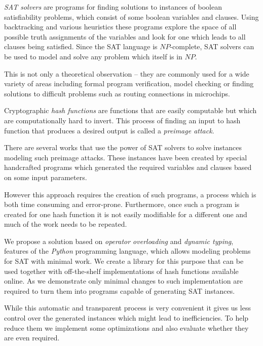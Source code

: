 
\emph{SAT solvers} are programs for finding solutions to instances of boolean satisfiability problems, which consist of some boolean variables and clauses.
Using backtracking and various heuristics these programs explore the space of all possible truth assignments of the variables and look for one which leads to all clauses being satisfied.
Since the SAT language is $NP$-complete, SAT solvers can be used to model and solve any problem which itself is in $NP$.

This is not only a theoretical observation -- they are commonly used for a wide variety of areas including formal program verification, model checking or finding solutions to difficult problems such as routing connections in microchips.

Cryptographic \emph{hash functions} are functions that are easily computable but which are computationally hard to invert.
This process of finding an input to hash function that produces a desired output is called a \emph{preimage attack}.

There are several works that use the power of SAT solvers to solve instances modeling such preimage attacks.
These instances have been created by special handcrafted programs which generated the required variables and clauses based on some input parameters.

However this approach requires the creation of such programs, a process which is both time consuming and error-prone.
Furthermore, once such a program is created for one hash function it is not easily modifiable for a different one and much of the work needs to be repeated.

We propose a solution based on \emph{operator overloading} and \emph{dynamic typing}, features of the \emph{Python} programming language, which allows modeling problems for SAT with minimal work.
We create a library for this purpose that can be used together with off-the-shelf implementations of hash functions available online.
As we demonstrate only minimal changes to such implementation are required to turn them into programs capable of generating SAT instances.

While this automatic and transparent process is very convenient it gives us less control over the generated instances which might lead to inefficiencies.
To help reduce them we implement some optimizations and also evaluate whether they are even required.